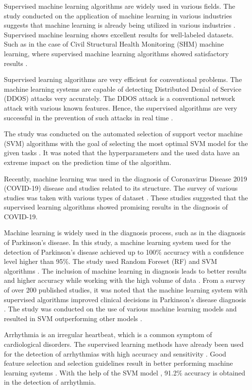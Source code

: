 \documentclass[a4paper,fleqn]{cas-dc}
\begin{document}
Supervised machine learning algorithms are widely used in various fields. The study conducted on the application of machine learning in various industries suggests that machine learning is already being utilized in various industries \cite{ref_paper_14}. Supervised machine learning shows excellent results for well-labeled datasets. Such as in the case of Civil Structural Health Monitoring (SHM) machine learning, where supervised machine learning algorithms showed satisfactory results \cite{ref_paper_6}.

Supervised learning algorithms are very efficient for conventional problems. The machine learning systems are capable of detecting Distributed Denial of Service (DDOS) attacks very accurately. The DDOS attack is a conventional network attack with various known features. Hence, the supervised algorithms are very successful in the prevention of such attacks in real time \cite{ref_paper_9}.

The study was conducted on the automated selection of support vector machine (SVM) algorithms with the goal of selecting the most optimal SVM model for the given tasks \cite{ref_paper_2}. It was noted that the hyperparameters and the used data have an extreme impact on the prediction time of the algorithm.

Recently, machine learning was used in the diagnosis of Coronavirus Disease 2019 (COVID-19) disease and studies related to its structure. The survey of various studies was taken with various types of dataset \cite{ref_paper_20}. These studies suggested that the supervised learning algorithms showed promising results in the diagnosis of COVID-19.

Machine learning is widely used in the diagnosis process, such as in the diagnosis of Parkinson's disease. In this study, a machine learning system used for the detection of Parkinson's disease achieved up to 100\% accuracy with a confidence level higher than 95\%. The study used Random Foreset (RF) and SVM algorithms \cite{ref_paper_34}. The inclusion of machine learning in diagnosis leads to better results and higher accuracy while working with the high volume of data \cite{ref_paper_15}. From a survey of over 200 published studies, it was noted that the machine learning system with supervised algorithms improved clinical decisions in Parkinson's disease diagnosis \cite{ref_paper_27}. The study was conducted on the use of various machine learning models and resulted in SVM outperforming other models \cite{ref_paper_30}.

Arrhythmia is an irregular heartbeat, which is a common symptom of cardiological disorders. The supervised learning methods have already been used for the detection of arrhythmias with high accuracy and sensitivity \cite{ref_paper_16}. Good feature selection and selection guidelines result in better performing machine learning systems \cite{ref_paper_28}. With the help of the SVM model \cite{ref_paper_38}, 91.2\% accuracy is obtained in the detection of arrhythmia.
\end{document}
